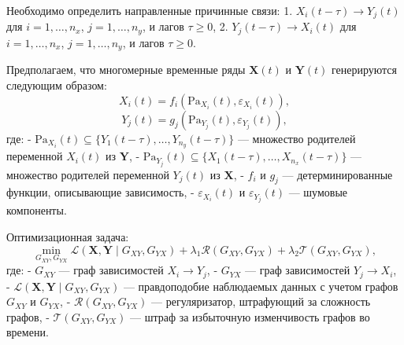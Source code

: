 \documentclass[a4paper, 12pt]{article}
\begin{document}
	Необходимо определить направленные причинные связи:
	1. \( X_i(t-\tau) \to Y_j(t) \) для \( i = 1, \ldots, n_x \), \( j = 1, \ldots, n_y \), и лагов \( \tau \geq 0 \),
	2. \( Y_j(t-\tau) \to X_i(t) \) для \( i = 1, \ldots, n_x \), \( j = 1, \ldots, n_y \), и лагов \( \tau \geq 0 \).
	
	
	Предполагаем, что многомерные временные ряды \( \mathbf{X}(t) \) и \( \mathbf{Y}(t) \) генерируются следующим образом:
	\[
	X_i(t) = f_i(\text{Pa}_{X_i}(t), \varepsilon_{X_i}(t)),
	\]
	\[
	Y_j(t) = g_j(\text{Pa}_{Y_j}(t), \varepsilon_{Y_j}(t)),
	\]
	где:
	- \( \text{Pa}_{X_i}(t) \subseteq \{Y_1(t-\tau), \ldots, Y_{n_y}(t-\tau)\} \) — множество родителей переменной \( X_i(t) \) из \( \mathbf{Y} \),
	- \( \text{Pa}_{Y_j}(t) \subseteq \{X_1(t-\tau), \ldots, X_{n_x}(t-\tau)\} \) — множество родителей переменной \( Y_j(t) \) из \( \mathbf{X} \),
	- \( f_i \) и \( g_j \) — детерминированные функции, описывающие зависимость,
	- \( \varepsilon_{X_i}(t) \) и \( \varepsilon_{Y_j}(t) \) — шумовые компоненты.
	
	Оптимизационная задача:
	\[
	\min_{G_{XY}, G_{YX}} \mathcal{L}(\mathbf{X}, \mathbf{Y} \mid G_{XY}, G_{YX}) + \lambda_1 \mathcal{R}(G_{XY}, G_{YX}) + \lambda_2 \mathcal{T}(G_{XY}, G_{YX}),
	\]
	где:
	- \( G_{XY} \) — граф зависимостей \( X_i \to Y_j \),
	- \( G_{YX} \) — граф зависимостей \( Y_j \to X_i \),
	- \( \mathcal{L}(\mathbf{X}, \mathbf{Y} \mid G_{XY}, G_{YX}) \) — правдоподобие наблюдаемых данных с учетом графов \( G_{XY} \) и \( G_{YX} \),
	- \( \mathcal{R}(G_{XY}, G_{YX}) \) — регуляризатор, штрафующий за сложность графов,
	- \( \mathcal{T}(G_{XY}, G_{YX}) \) — штраф за избыточную изменчивость графов во времени.
	 
	
\end{document}
